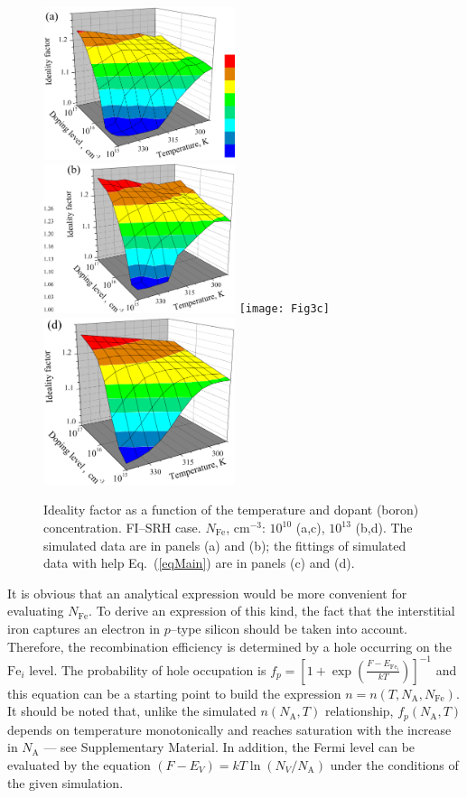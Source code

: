 \documentclass [sort&compress] {elsarticle}
\begin{document}
\begin{figure}
\includegraphics[width=0.5\textwidth]{Fig3a}%
\includegraphics[width=0.5\textwidth]{Fig3b}
\texttt{[image: Fig3c]}
\includegraphics[width=0.5\textwidth]{Fig3d}
\caption{\label{figA}
Ideality factor as a function of the temperature and dopant (boron) concentration.
FI--SRH case.
$N_\mathrm{Fe}$, cm$^{-3}$: $10^{10}$ (a,c), $10^{13}$ (b,d).
The simulated data are in panels (a) and (b);
the fittings of simulated data with help Eq.~(\ref{eqMain})
are in panels (c) and (d).
}%
\end{figure}

It is obvious that an analytical expression would be more convenient for evaluating $N_\mathrm{Fe}$.
To derive an expression of this kind, the fact that the interstitial iron captures an electron in $p$--type silicon should be taken into account.
Therefore, the recombination efficiency is determined by a hole occurring on the $\mathrm{Fe}_i$ level.
The probability of hole occupation is $f_p=\left[1+\exp\left(\frac{F-E_{\mathrm{Fe}_i}}{kT}\right)\right]^{-1}$
and this equation can be a starting point to build the expression $n=n(T,N_\mathrm{A},N_\mathrm{Fe})$.
It should be noted that, unlike the simulated  $n(N_\mathrm{A},T)$ relationship,
$f_p(N_\mathrm{A},T)$ depends on temperature monotonically and reaches saturation with the increase in $N_\mathrm{A}$ --- see Supplementary Material.
In addition, the Fermi level can be evaluated by the equation $(F-E_V)=kT\ln(N_V/N_\mathrm{A})$ under the conditions of the given simulation.
\end{document}

